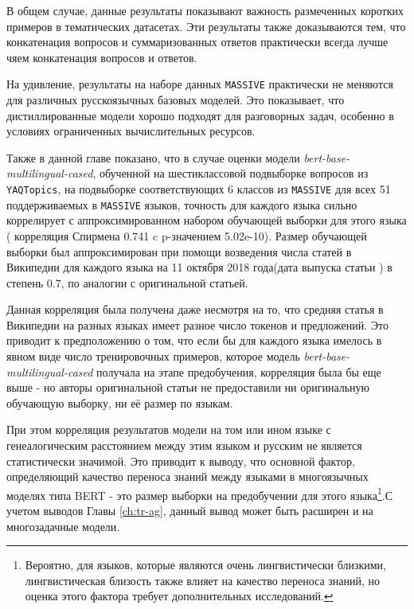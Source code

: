В общем случае, данные результаты показывают важность размеченных коротких примеров в тематических датасетах. Эти результаты также доказываются тем, что конкатенация вопросов и суммаризованных ответов практически всегда лучше чяем конкатенация вопросов и ответов. 

На удивление, результаты на наборе данных \texttt{MASSIVE} практически не меняются для различных русскоязычных базовых моделей. Это показывает, что дистиллированные модели хорошо подходят для разговорных задач, особенно в условиях ограниченных вычислительных ресурсов. 

Также в данной главе показано, что в случае оценки модели  \textit{bert-base-multilingual-cased}, обученной на шестиклассовой подвыборке вопросов из \texttt{YAQTopics}, на подвыборке соответствующих 6 классов из \texttt{MASSIVE} для всех 51 поддерживаемых в \texttt{MASSIVE} языков, точность для каждого языка сильно коррелирует с аппроксимированном набором обучающей выборки для этого языка ( корреляция Спирмена 0.741 c p-значением 5.02e-10). Размер обучающей выборки был аппроксимирован при помощи возведения числа статей в Википедии для каждого языка на 11 октября 2018 года(дата выпуска статьи \cite{bert}) в степень 0.7, по аналогии с оригинальной статьей. 

Данная корреляция была получена даже несмотря на то, что средняя статья в Википедии на разных языках имеет разное число токенов и предложений. Это приводит к предположению о том, что если бы для каждого языка имелось в явном виде число тренировочных примеров, которое модель \textit{bert-base-multilingual-cased} получала на этапе предобучения, корреляция была бы еще выше - но авторы оригинальной статьи не предоставили ни оригинальную обучающую выборку, ни её размер по языкам. 

При этом корреляция результатов модели на том или ином языке с генеалогическим расстоянием между этим языком и русским не является статистически значимой. Это приводит к выводу, что основной фактор, определяющий качество переноса знаний между языками в многоязычных моделях типа BERT - это размер выборки на предобучении для этого языка\footnote{Вероятно, для языков, которые являются очень лингвистически близкими, лингвистическая близость также влияет на качество переноса знаний, но оценка этого фактора требует дополнительных исследований.}.С учетом выводов Главы \ref{ch:tr-ag}, данный вывод может быть расширен и на многозадачные модели. 


 
